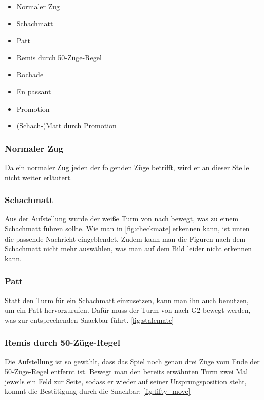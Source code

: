 \begin{itemize}
	\item Normaler Zug
	\item Schachmatt
	\item Patt
	\item Remis durch 50-Züge-Regel
	\item Rochade
	\item En passant
	\item Promotion
	\item (Schach-)Matt durch Promotion
\end{itemize}

\subsubsection{Normaler Zug}

Da ein normaler Zug jeden der folgenden Züge betrifft, wird er an dieser Stelle
nicht weiter erläutert.

\subsubsection{Schachmatt}
\label{sssec:checkmate}

Aus der Aufstellung wurde der weiße Turm von  nach  bewegt,
was zu einem Schachmatt führen sollte. Wie man in \autoref{fig:checkmate}
erkennen kann, ist unten die passende Nachricht eingeblendet. Zudem kann man die
Figuren nach dem Schachmatt nicht mehr auswählen, was man auf dem Bild leider
nicht erkennen kann.

\subsubsection{Patt}

Statt den Turm für ein Schachmatt einzusetzen, kann man ihn auch benutzen, um
ein Patt hervorzurufen. Dafür muss der Turm von  nach {G2} bewegt
werden, was zur entsprechenden Snackbar führt. \autoref{fig:stalemate}

\subsubsection{Remis durch 50-Züge-Regel}

Die Aufstellung ist so gewählt, dass das Spiel noch genau drei Züge vom Ende der
50-Züge-Regel entfernt ist. Bewegt man den bereits erwähnten Turm zwei Mal
jeweils ein Feld zur Seite, sodass er wieder auf seiner Ursprungsposition steht,
kommt die Bestätigung durch die Snackbar: \autoref{fig:fifty_move}

